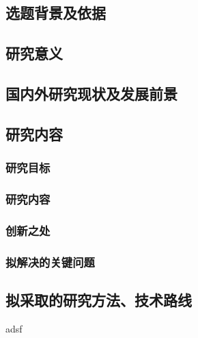 \documentclass[
]{article}
\begin{document}
\subsection{选题背景及依据}\label{ux9009ux9898ux80ccux666fux53caux4f9dux636e}

\subsection{研究意义}\label{ux7814ux7a76ux610fux4e49}

\subsection{国内外研究现状及发展前景}\label{ux56fdux5185ux5916ux7814ux7a76ux73b0ux72b6ux53caux53d1ux5c55ux524dux666f}

\subsection{研究内容}\label{ux7814ux7a76ux5185ux5bb9}

\subsubsection{研究目标}\label{ux7814ux7a76ux76eeux6807}

\subsubsection{研究内容}\label{ux7814ux7a76ux5185ux5bb9-1}

\subsubsection{创新之处}\label{ux521bux65b0ux4e4bux5904}

\subsubsection{拟解决的关键问题}\label{ux62dfux89e3ux51b3ux7684ux5173ux952eux95eeux9898}

\subsection{拟采取的研究方法、技术路线}\label{ux62dfux91c7ux53d6ux7684ux7814ux7a76ux65b9ux6cd5ux6280ux672fux8defux7ebf}

{}

adsf
\end{document}
